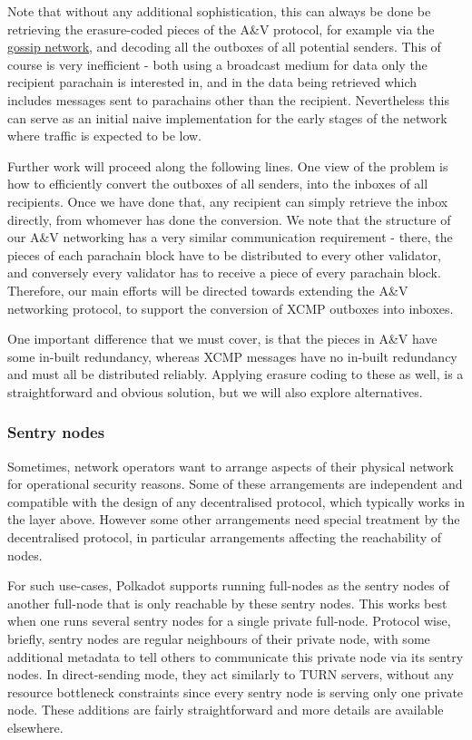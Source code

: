Note that without any additional sophistication, this can always be done be
retrieving the erasure-coded pieces of the A\&V protocol, for example via the
\hyperref[sec:gossiping]{gossip network}, and decoding all the outboxes of all
potential senders. This of course is very inefficient - both using a broadcast
medium for data only the recipient parachain is interested in, and in the data
being retrieved which includes messages sent to parachains other than the
recipient. Nevertheless this can serve as an initial naive implementation for
the early stages of the network where traffic is expected to be low.

Further work will proceed along the following lines. One view of the problem is
how to efficiently convert the outboxes of all senders, into the inboxes of all
recipients. Once we have done that, any recipient can simply retrieve the inbox
directly, from whomever has done the conversion. We note that the structure of
our A\&V networking has a very similar communication requirement - there, the
pieces of each parachain block have to be distributed to every other validator,
and conversely every validator has to receive a piece of every parachain block.
Therefore, our main efforts will be directed towards extending the A\&V
networking protocol, to support the conversion of XCMP outboxes into inboxes.

One important difference that we must cover, is that the pieces in A\&V have
some in-built redundancy, whereas XCMP messages have no in-built redundancy and
must all be distributed reliably. Applying erasure coding to these as well, is
a straightforward and obvious solution, but we will also explore alternatives.

\subsubsection{Sentry nodes} \label{sec:net_sentry}

Sometimes, network operators want to arrange aspects of their physical network
for operational security reasons. Some of these arrangements are independent
and compatible with the design of any decentralised protocol, which typically
works in the layer above. However some other arrangements need special
treatment by the decentralised protocol, in particular arrangements affecting
the reachability of nodes.

For such use-cases, Polkadot supports running full-nodes as the sentry nodes of
another full-node that is only reachable by these sentry nodes. This works best
when one runs several sentry nodes for a single private full-node. Protocol
wise, briefly, sentry nodes are regular neighbours of their private node, with
some additional metadata to tell others to communicate this private node via
its sentry nodes. In direct-sending mode, they act similarly to TURN servers,
without any resource bottleneck constraints since every sentry node is serving
only one private node. These additions are fairly straightforward and more
details are available elsewhere.

